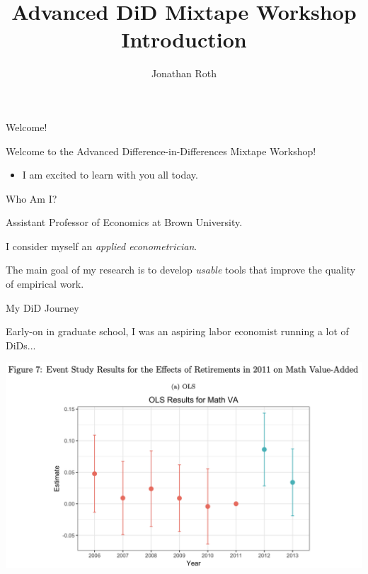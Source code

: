 \documentclass[aspectratio = 169, 12pt]{beamer}
\author{Jonathan Roth}
\title[Advanced DiD Mixtape Workshop]{Advanced DiD Mixtape Workshop \\ Introduction}
\begin{document}

\begin{frame}{Welcome!}

  Welcome to the Advanced Difference-in-Differences Mixtape Workshop!

  \medskip
  \begin{itemize}
    \item I am excited to learn with you all today.
  \end{itemize}

\end{frame}


\begin{frame}{Who Am I?}
  \begin{wideitemize}

    \item
    Assistant Professor of Economics at Brown University.

    \item
    I consider myself an \textit{applied econometrician}.

    \item
    The main goal of my research is to develop \textit{usable} tools that improve the quality of empirical work.

  \end{wideitemize}
\end{frame}


\begin{frame}{My DiD Journey}

  \begin{wideitemize}
    \item
    Early-on in graduate school, I was an aspiring labor economist running a lot of DiDs...

  \end{wideitemize}
  \centering
  \includegraphics[width =0.75\linewidth]{figures/act10-figure.png}

\end{frame}
\end{document}
